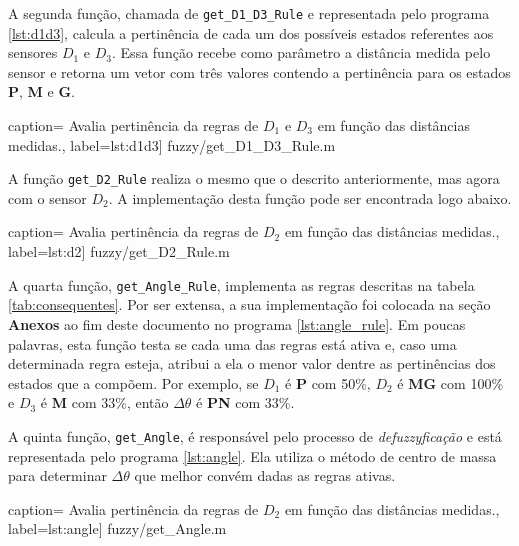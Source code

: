 	\vspace{12pt}
	
	A segunda função, chamada de \texttt{get\_D1\_D3\_Rule} e representada pelo
	programa \ref{lst:d1d3}, calcula a pertinência de cada um dos possíveis estados
	referentes aos sensores \(D_1\) e \(D_3\).	Essa função recebe como parâmetro a
	distância medida pelo sensor e retorna um vetor com três valores contendo a
	pertinência para os estados \textbf{P}, \textbf{M} e \textbf{G}. 
	
	 caption={
	Avalia pertinência da regras de \(D_1\) e \(D_3\) em função das distâncias
	medidas.}, label={lst:d1d3}] {fuzzy/get_D1_D3_Rule.m}

	\vspace{12pt}
	
	A função \texttt{get\_D2\_Rule} realiza o mesmo que o descrito anteriormente,
	mas agora com o sensor \(D_2\). A implementação desta função pode ser
	encontrada logo abaixo.
	
	 caption={
	Avalia pertinência da regras de \(D_2\) em função das distâncias
	medidas.}, label={lst:d2}] {fuzzy/get_D2_Rule.m} 
	
	\vspace{12pt}
	
	A quarta função, \texttt{get\_Angle\_Rule}, implementa as regras descritas na
	tabela \ref{tab:consequentes}. Por ser extensa, a sua implementação foi
	colocada na seção \textbf{Anexos} ao fim deste documento no programa
	\ref{lst:angle_rule}. Em poucas palavras, esta função testa se cada uma das
	regras está ativa e, caso uma determinada regra esteja, atribui a ela o menor
	valor dentre as pertinências dos estados que a compõem. Por exemplo, se \(D_1\)
	é \textbf{P} com 50\%, \(D_2\) é \textbf{MG} com 100\% e \(D_3\) é \textbf{M}
	com 33\%, então \(\Delta \theta\) é \textbf{PN} com 33\%.
	
	\vspace{12pt}
	
	A quinta função, \texttt{get\_Angle}, é responsável pelo processo de
	\textit{defuzzyficação} e está representada pelo programa \ref{lst:angle}. Ela
	utiliza o método de centro de massa para determinar \(\Delta \theta\) que
	melhor convém dadas as regras ativas.
	
	 caption={
	Avalia pertinência da regras de \(D_2\) em função das distâncias
	medidas.}, label={lst:angle}] {fuzzy/get_Angle.m}
	
